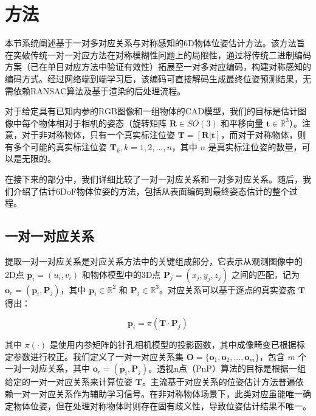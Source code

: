 \section{方法}\label{symnet_方法}

\par 本节系统阐述基于一对多对应关系与对称感知的6D物体位姿估计方法。该方法旨在突破传统一对一对应方法在对称模糊性问题上的局限性，通过将传统二进制编码方案（已在单目对应方法中验证有效性\cite{2024hipose, su2022zebrapose}）拓展至一对多对应编码，构建对称感知的编码方式。经过网络端到端学习后，该编码可直接解码生成最终位姿预测结果，无需依赖RANSAC算法及基于渲染的后处理流程。

\par 对于给定具有已知内参的RGB图像和一组物体的CAD模型，我们的目标是估计图像中每个物体相对于相机的姿态（旋转矩阵 $\mathbf{R} \in SO(3)$ 和平移向量 $\mathbf{t} \in \mathbb{R}^3$）。注意，对于非对称物体，只有一个真实标注位姿 $\mathbf{T}=[\mathbf{R}|\mathbf{t}]$，而对于对称物体，则有多个可能的真实标注位姿 $\mathbf{T}_k, k=1, 2,...,n$，其中 $n$ 是真实标注位姿的数量，可以是无限的。

\par 在接下来的部分中，我们详细比较了一对一对应关系和一对多对应关系。随后，我们介绍了估计6DoF物体位姿的方法，包括从表面编码到最终姿态估计的整个过程。

\subsection{一对一对应关系}

提取一对一对应关系是对应关系方法中的关键组成部分，它表示从观测图像中的2D点 $\mathbf{p}_i=(u_i,v_i)$ 和物体模型中的3D点 $\mathbf{P}_j=(x_j,y_j,z_j)$ 之间的匹配，记为 $\mathbf{o}_r = (\mathbf{p}_i, \mathbf{P}_j)$，其中 $\mathbf{p}_i\in \mathbb{R}^2$ 和 $\mathbf{P}_j\in \mathbb{R}^3$。对应关系可以基于逐点的真实姿态 $\mathbf{T}$ 得出：

\begin{equation}
        \mathbf{p}_i=\pi(\mathbf{T}\cdot \mathbf{P}_j) 
        \label{eq:projection}
\end{equation}

其中 $\pi(\cdot)$ 是使用内参矩阵的针孔相机模型的投影函数，其中成像畸变已根据标定参数进行校正。我们定义了一对一对应关系集 $\mathbf{O} = \{\mathbf{o}_1, \mathbf{o}_2, ..., \mathbf{o}_m\}$，包含 $m$ 个一对一对应关系，其中 $\mathbf{o}_r = (\mathbf{p}_i, \mathbf{P}_j)$。透视n点（PnP）算法的目标是根据一组给定的一对一对应关系来计算位姿 $\mathbf{T}$。主流基于对应关系的位姿估计方法普遍依赖一对一对应关系作为辅助学习信号。在非对称物体场景下，此类对应虽能唯一确定物体位姿，但在处理对称物体时则存在固有歧义性，导致位姿估计结果不唯一。

